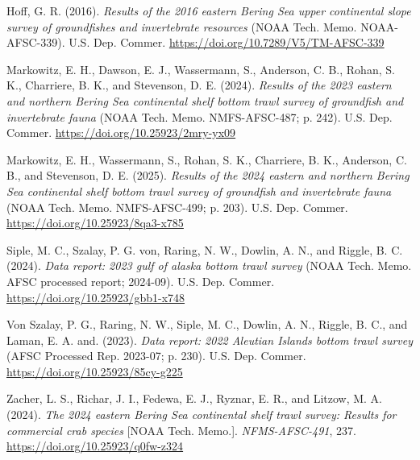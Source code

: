 \documentclass[
  letterpaper,
  oneside,
  open=any]{scrbook}
\newlength{\cslhangindent}
\newenvironment{CSLReferences}[2] %
 {\begin{list}{}{%
  \setlength{\itemindent}{0pt}
  \setlength{\leftmargin}{0pt}
  \setlength{\parsep}{0pt}
  \ifodd #1
   \setlength{\leftmargin}{\cslhangindent}
   \setlength{\itemindent}{-1\cslhangindent}
  \fi
  \setlength{\itemsep}{#2\baselineskip}}}
 {\end{list}}
\begin{document}
\label{refs}
\begin{CSLReferences}{1}{0}
Hoff, G. R. (2016). \emph{Results of the 2016 eastern {Bering Sea} upper
continental slope survey of groundfishes and invertebrate resources}
(NOAA Tech. Memo. NOAA-AFSC-339). {U.S. Dep. Commer.}
\url{https://doi.org/10.7289/V5/TM-AFSC-339}

Markowitz, E. H., Dawson, E. J., Wassermann, S., Anderson, C. B., Rohan,
S. K., Charriere, B. K., and Stevenson, D. E. (2024). \emph{Results of
the 2023 eastern and northern {Bering Sea} continental shelf bottom
trawl survey of groundfish and invertebrate fauna} (NOAA Tech. Memo.
NMFS-AFSC-487; p. 242). {U.S. Dep. Commer.}
\url{https://doi.org/10.25923/2mry-yx09}

Markowitz, E. H., Wassermann, S., Rohan, S. K., Charriere, B. K.,
Anderson, C. B., and Stevenson, D. E. (2025). \emph{Results of the 2024
eastern and northern {Bering Sea} continental shelf bottom trawl survey
of groundfish and invertebrate fauna} (NOAA Tech. Memo. NMFS-AFSC-499;
p. 203). {U.S. Dep. Commer.} \url{https://doi.org/10.25923/8qa3-x785}

Siple, M. C., Szalay, P. G. von, Raring, N. W., Dowlin, A. N., and
Riggle, B. C. (2024). \emph{Data report: 2023 gulf of alaska bottom
trawl survey} (NOAA Tech. Memo. AFSC processed report; 2024-09). {U.S.
Dep. Commer.} \url{https://doi.org/10.25923/gbb1-x748}

Von Szalay, P. G., Raring, N. W., Siple, M. C., Dowlin, A. N., Riggle,
B. C., and Laman, E. A. and. (2023). \emph{Data report: 2022 {Aleutian
Islands} bottom trawl survey} (AFSC Processed Rep. 2023-07; p. 230).
{U.S. Dep. Commer.} \url{https://doi.org/10.25923/85cy-g225}

Zacher, L. S., Richar, J. I., Fedewa, E. J., Ryznar, E. R., and Litzow,
M. A. (2024). \emph{The 2024 eastern {Bering Sea} continental shelf
trawl survey: Results for commercial crab species} {[}NOAA Tech.
Memo.{]}. \emph{NFMS-AFSC-491}, 237.
\url{https://doi.org/10.25923/q0fw-z324}

\end{CSLReferences}


\backmatter
\end{document}
